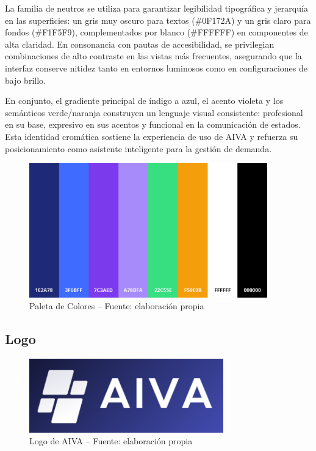 La familia de neutros se utiliza para garantizar legibilidad tipográfica y jerarquía en las superficies: un gris muy oscuro para textos (\#0F172A) y un gris claro para fondos (\#F1F5F9), complementados por blanco (\#FFFFFF) en componentes de alta claridad. En consonancia con pautas de accesibilidad, se privilegian combinaciones de alto contraste en las vistas más frecuentes, asegurando que la interfaz conserve nitidez tanto en entornos luminosos como en configuraciones de bajo brillo.

En conjunto, el gradiente principal de índigo a azul, el acento violeta y los semánticos verde/naranja construyen un lenguaje visual consistente: profesional en su base, expresivo en sus acentos y funcional en la comunicación de estados. Esta identidad cromática sostiene la experiencia de uso de AIVA y refuerza su posicionamiento como asistente inteligente para la gestión de demanda.

\begin{figure}[!htbp]
  \centering
  \includegraphics[width=0.92\textwidth]{images/paleta-aiva.png}
  \caption{Paleta de Colores -- Fuente: elaboración propia}
  \label{fig:paleta-aiva}
\end{figure}

\subsection{Logo}

\begin{figure}[!htbp]
  \centering
  \includegraphics[width=0.75\textwidth]{images/logo.PNG}
  \caption{Logo de AIVA -- Fuente: elaboración propia}
  \label{fig:AIVA-logo}
\end{figure}

